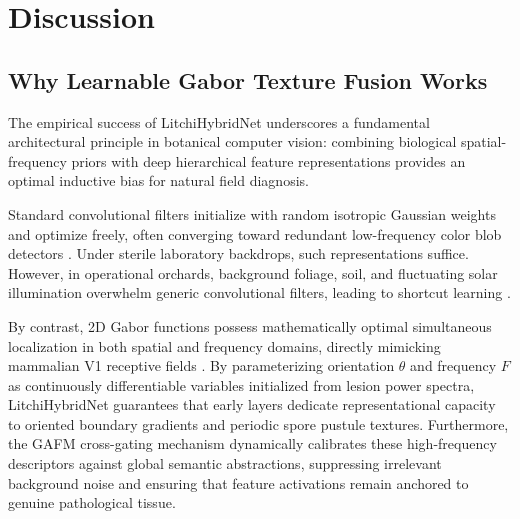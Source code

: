 \section{Discussion}
\label{sec:discussion}

\subsection{Why Learnable Gabor Texture Fusion Works}
The empirical success of LitchiHybridNet underscores a fundamental architectural principle in botanical computer vision: combining biological spatial-frequency priors with deep hierarchical feature representations provides an optimal inductive bias for natural field diagnosis.

Standard convolutional filters initialize with random isotropic Gaussian weights and optimize freely, often converging toward redundant low-frequency color blob detectors \cite{wang2021gabor}. Under sterile laboratory backdrops, such representations suffice. However, in operational orchards, background foliage, soil, and fluctuating solar illumination overwhelm generic convolutional filters, leading to shortcut learning \cite{singh2020deep}.

By contrast, 2D Gabor functions possess mathematically optimal simultaneous localization in both spatial and frequency domains, directly mimicking mammalian V1 receptive fields \cite{daugman1985uncertainty}. By parameterizing orientation $\theta$ and frequency $F$ as continuously differentiable variables initialized from lesion power spectra, LitchiHybridNet guarantees that early layers dedicate representational capacity to oriented boundary gradients and periodic spore pustule textures. Furthermore, the GAFM cross-gating mechanism dynamically calibrates these high-frequency descriptors against global semantic abstractions, suppressing irrelevant background noise and ensuring that feature activations remain anchored to genuine pathological tissue.

